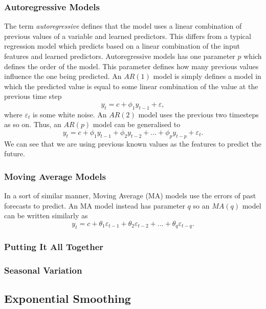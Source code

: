 \documentclass{article}
\begin{document}
  \subsubsection{Autoregressive Models}
  The term \emph{autoregressive} defines that the model uses a linear combination of previous values of a variable and learned predictors. This differs from a typical regression model which predicts based on a linear combination of the input features and learned predictors.
  Autoregressive models has one parameter $p$ which defines the order of the model. This parameter defines how many previous values influence the one being predicted. 
  An $AR(1)$ model is simply defines a model in which the predicted value is equal to some linear combination of the value at the previous time step
  \begin{equation*}
    y_t=c + \phi_1 y_{t-1} + \varepsilon,
  \end{equation*}
  where $\varepsilon_t$ is some white noise.
  An $AR(2)$ model uses the previous two timesteps as so on.
  Thus, an $AR(p)$ model can be generalised to
  \begin{equation*}
    y_t=c + \phi_1 y_{t-1} + \phi_2 y_{t-2} + ... + \phi_p y_{t-p} + \varepsilon_t.
  \end{equation*}
  We can see that we are using previous known values as the features to predict the future. 
  \subsubsection{Moving Average Models}
  In a sort of similar manner, Moving Average (MA) models use the errors of past forecasts to predict. An MA model instead has parameter $q$ so an $MA(q)$ model can be written similarly as
  \begin{equation*}
    y_t=c + \theta_1 \varepsilon_{t-1} + \theta_2 \varepsilon_{t-2} + ... + \theta_q \varepsilon_{t-q}.
  \end{equation*}
  \subsubsection{Putting It All Together}
  \subsubsection{Seasonal Variation}
  \subsection{Exponential Smoothing}
\end{document}
